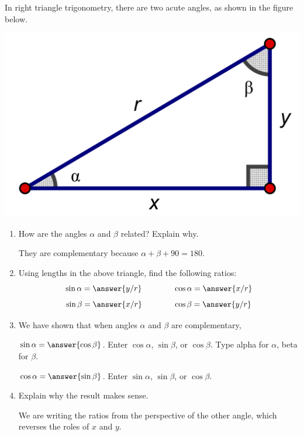 \documentclass[nooutcomes]{ximera}
\begin{document}
\begin{problem}
In right triangle trigonometry, there are two acute angles, as shown in the figure below.
\begin{image}
\includegraphics[scale=0.8]{rightTriangle2.png}
\end{image}
\begin{enumerate}
\item How are the angles $\alpha$ and $\beta$ related?  Explain why.  \begin{hint}They are complementary because $\alpha+\beta+90=180$.\end{hint}
\item Using lengths in the above triangle, find the following ratios:    
\[
\sin\alpha = \answer{y/r} \qquad\qquad \cos\alpha = \answer{x/r}
\]
\[
\sin\beta = \answer{x/r} \qquad\qquad \cos\beta = \answer{y/r}
\]
\item We have shown that when angles $\alpha$ and $\beta$ are complementary, 

$\sin\alpha=\answer{\cos\beta}$.  \qquad Enter $\cos\alpha$, $\sin\beta$, or $\cos\beta$.  Type alpha for $\alpha$, beta for $\beta$.  

$\cos\alpha =\answer{\sin\beta}$.  \qquad Enter $\sin\alpha$, $\sin\beta$, or $\cos\beta$.  

\item Explain why the result makes sense.  \begin{hint}We are writing the ratios from the perspective of the other angle, which reverses 
the roles of $x$ and $y$.\end{hint}
\end{enumerate}
\end{problem}
\end{document}
